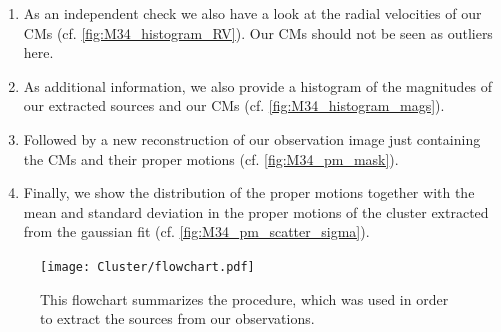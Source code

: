 \documentclass{article}
\begin{document}
\begin{enumerate}
\item As an independent check we also have a look at the radial velocities of our CMs (cf. \ref{fig:M34_histogram_RV}). Our CMs should not be seen as outliers here.
\item As additional information, we also provide a histogram of the magnitudes of our extracted sources and our CMs (cf. \ref{fig:M34_histogram_mags}).
\item Followed by a new reconstruction of our observation image just containing the CMs and their proper motions (cf. \ref{fig:M34_pm_mask}). 
\item Finally, we show the distribution of the proper motions together with the mean and standard deviation in the proper motions of the cluster extracted from the gaussian fit (cf. \ref{fig:M34_pm_scatter_sigma}).
\end{enumerate}

\begin{figure}[H]
  \centering
    \texttt{[image: Cluster/flowchart.pdf]}
  \caption{This flowchart summarizes the procedure, which was used in order to extract the sources from our observations.}
  \label{fig:flowchart}
\end{figure}
\end{document}
